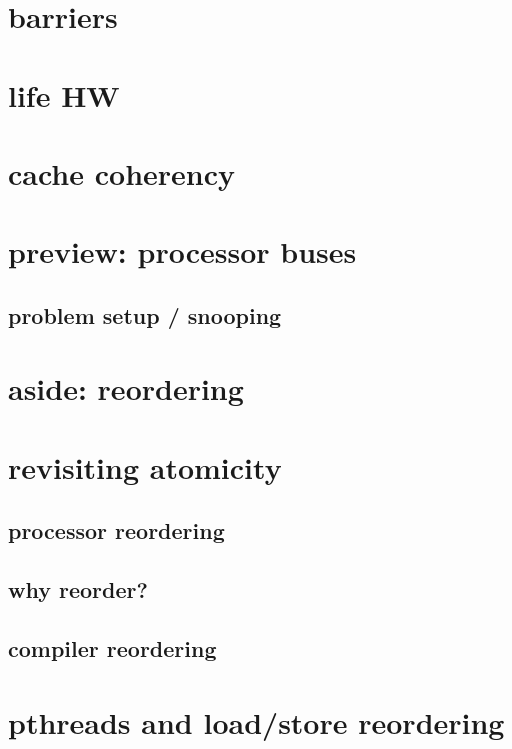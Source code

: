 \section{barriers}


\section{life HW}


\section{cache coherency}
\section{preview: processor buses}


\subsection{problem setup / snooping}


\section{aside: reordering}

\section{revisiting atomicity}
\subsection{processor reordering}


\subsection{why reorder?}



\subsection{compiler reordering}



\section{pthreads and load/store reordering}


